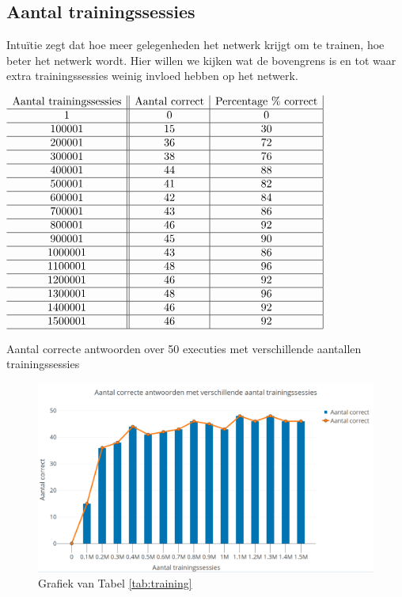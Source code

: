 \subsection{Aantal trainingssessies}
Intu\"itie zegt dat hoe meer gelegenheden het netwerk krijgt om te trainen, hoe beter het netwerk wordt. Hier willen we kijken wat de bovengrens is en tot waar extra trainingssessies weinig invloed hebben op het netwerk.

\begin{table}[ht]
    \centering
      $\begin{array}{c||c|c |}
        \text{Aantal trainingssessies} & \text{Aantal correct} & \text{Percentage \% correct} \\ \hline
        1 & 0 & 0 \\ \hline
        100001 & 15 & 30 \\ \hline
        200001 & 36 & 72 \\ \hline
        300001 & 38 & 76 \\ \hline
        400001 & 44 & 88 \\ \hline
        500001 & 41 & 82 \\ \hline
        600001 & 42 & 84 \\ \hline
        700001 & 43 & 86 \\ \hline
        800001 & 46 & 92 \\ \hline
        900001 & 45 & 90 \\ \hline
        1000001 & 43 & 86 \\ \hline
        1100001 & 48 & 96 \\ \hline
        1200001 & 46 & 92 \\ \hline
        1300001 & 48 & 96 \\ \hline
        1400001 & 46 & 92 \\ \hline
        1500001 & 46 & 92 \\ \hline
      \end{array}$
    \caption{Aantal correcte antwoorden over 50 executies met verschillende aantallen trainingssessies}
    \label{tab:training}
\end{table}

\begin{figure}[ht!]
    \centering
    \includegraphics[scale=0.3]{graphs/training.png}
    \caption{Grafiek van Tabel \ref{tab:training}}
    \label{fig:training}
\end{figure}

